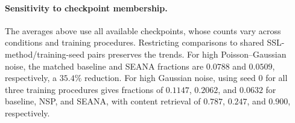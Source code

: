 \paragraph{Sensitivity to checkpoint membership.}
The averages above use all available checkpoints, whose counts vary across
conditions and training procedures. Restricting comparisons to shared
SSL-method/training-seed pairs preserves the trends. For high Poisson--Gaussian
noise, the matched baseline and SEANA fractions are $0.0788$ and $0.0509$,
respectively, a $35.4\%$ reduction. For high Gaussian noise, using seed 0 for
all three training procedures gives fractions of $0.1147$, $0.2062$, and
$0.0632$ for baseline, NSP, and SEANA, with content retrieval of $0.787$,
$0.247$, and $0.900$, respectively.
